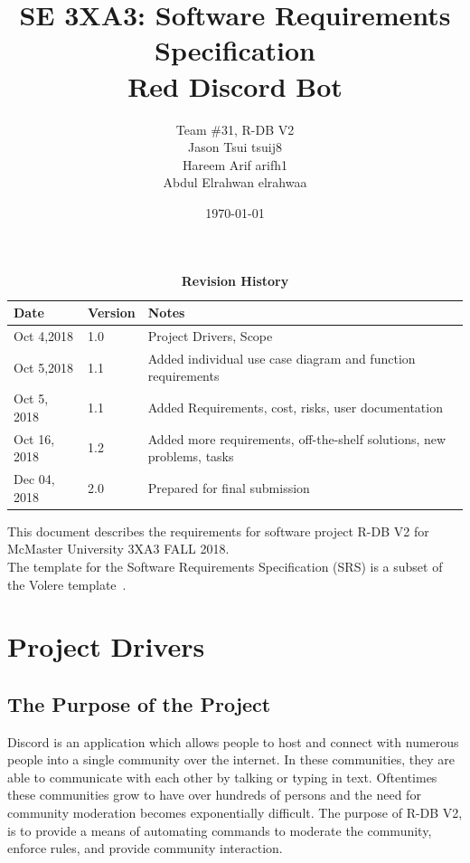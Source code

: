 \documentclass[12pt, titlepage]{article}
\title{SE 3XA3: Software Requirements Specification\\Red Discord Bot}
\author{Team \#31, R-DB V2
		\\ Jason Tsui tsuij8
		\\ Hareem Arif arifh1
		\\ Abdul Elrahwan elrahwaa
}
\date{\today}
\begin{document}
\maketitle

\tableofcontents
\listoftables
\listoffigures

\begin{table}[!bp]
\caption{\bf Revision History}
\begin{tabularx}{\textwidth}{p{3cm}p{2cm}X}
\toprule {\bf Date} & {\bf Version} & {\bf Notes}\\
\midrule
Oct 4,2018 & 1.0 & Project Drivers, Scope\\
Oct 5,2018 & 1.1 & Added individual use case diagram and function requirements\\
Oct 5, 2018 & 1.1 & Added Requirements, cost, risks, user documentation \\
Oct 16, 2018 & 1.2 & Added more requirements, off-the-shelf solutions, new problems, tasks\\Dec 04, 2018 & 2.0 & Prepared for final submission \\
\bottomrule
\end{tabularx}
\end{table}

\newpage


This document describes the requirements for software project R-DB V2 for McMaster University 3XA3 FALL 2018.\\

The template for the Software
Requirements Specification (SRS) is a subset of the Volere
template~\citep{RobertsonAndRobertson2012}.



\section{Project Drivers}

\subsection{The Purpose of the Project}
Discord is an application which allows people to host and connect with numerous people into a single community over the internet. In these communities, they are able to communicate with each other by talking or typing in text. Oftentimes these communities grow to have over hundreds of persons and the need for community moderation becomes exponentially difficult. The purpose of R-DB V2, is to provide a means of automating commands to moderate the community, enforce rules, and provide community interaction. 
\end{document}
